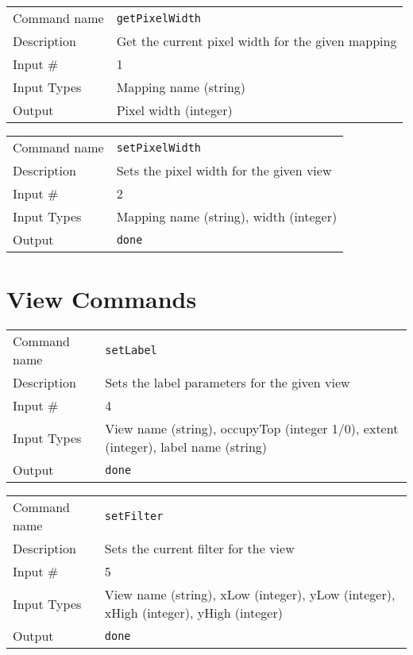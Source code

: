 \bigskip

\noindent
\begin{tabular}{l|p{5in}}
\hline
Command name & {\tt getPixelWidth} \\
Description  & Get the current pixel width for the given mapping \\
Input \#     & 1 \\
Input Types  & Mapping name (string) \\
Output       & Pixel width (integer) \\
\hline
\end{tabular}

\bigskip

\noindent
\begin{tabular}{l|p{5in}}
\hline
Command name & {\tt setPixelWidth} \\
Description  & Sets the pixel width for the given view \\
Input \#     & 2 \\
Input Types  & Mapping name (string), width (integer) \\
Output       & {\tt done} \\
\hline
\end{tabular}

\section{View Commands}

\noindent
\begin{tabular}{l|p{5in}}
\hline
Command name & {\tt setLabel} \\
Description  & Sets the label parameters for the given view \\
Input \#     & 4 \\
Input Types  & View name (string), occupyTop (integer 1/0),
               extent (integer), label name (string) \\
Output       & {\tt done} \\
\hline
\end{tabular}

\bigskip

\noindent
\begin{tabular}{l|p{5in}}
\hline
Command name & {\tt setFilter} \\
Description  & Sets the current filter for the view \\
Input \#     & 5 \\
Input Types  & View name (string), xLow (integer), yLow (integer),
               xHigh (integer), yHigh (integer) \\
Output       & {\tt done} \\
\hline
\end{tabular}

